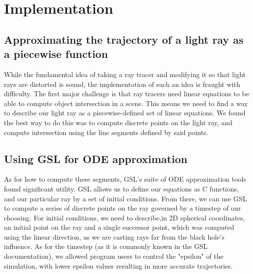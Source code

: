 
\section{Implementation}
\label{sec:impl}


\subsection {Approximating the trajectory of a light ray as a piecewise function}
While the fundamental idea of taking a ray tracer and modifying it so that light rays are distorted is sound, the implementation of such an idea is fraught with difficulty. The first major challenge is that ray tracers need linear equations to be able to compute object intersection in a scene. This means we need to find a way to describe our light ray as a piecewise-defined set of linear equations. We found the best way to do this was to compute discrete points on the light ray, and compute intersection using the line segments defined by said points. 

\subsection {Using GSL for ODE approximation}
As for how to compute these segments, GSL's suite of ODE approximation tools found significant utility. GSL allows us to define our equations as C functions, and our particular ray by a set of initial conditions. From there, we can use GSL to compute a series of discrete points on the ray governed by a timestep of our choosing. For initial conditions, we need to describe,in 2D spherical coordinates, an initial point on the ray and a single successor point, which was computed using the linear direction, as we are casting rays far from the black hole's influence. As for the timestep (as it is commonly known in the GSL documentation), we allowed program users to control the "epsilon" of the simulation, with lower epsilon values resulting in more accurate trajectories. 

